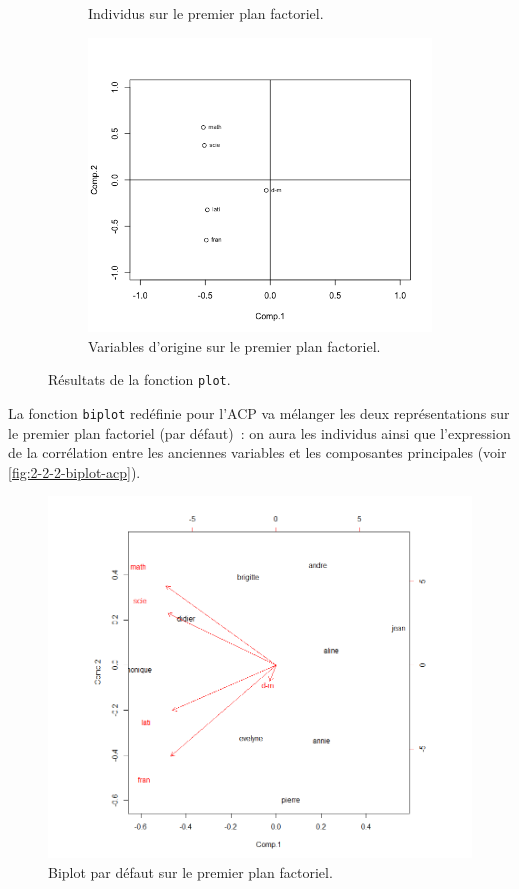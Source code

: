 \documentclass[a4paper,11pt]{report}
\begin{document}
\begin{figure}[H]
\begin{subfigure}[b]{0.28\linewidth}
		\caption{\scriptsize Individus sur le premier plan factoriel.}
		\label{fig:2-2-2-plot-acp-scores}
	\end{subfigure}%
	\begin{subfigure}[b]{0.28\linewidth}
		\centering
		\captionsetup{justification=centering}
		\includegraphics[width=1\linewidth]{img/2-2-2-plot-acp-loadings}
		\caption{\scriptsize Variables d'origine sur le premier plan factoriel.}
		\label{fig:2-2-2-plot-acp-loadings}
	\end{subfigure}%
	\caption{Résultats de la fonction \texttt{plot}.}
\end{figure}



La fonction \texttt{biplot} redéfinie pour l'ACP va mélanger les deux représentations sur le premier plan factoriel (par défaut)~: on aura les individus ainsi que l'expression de la corrélation entre les anciennes variables et les composantes principales (voir \autoref{fig:2-2-2-biplot-acp}).

\begin{figure}[H]
	\centering
	\captionsetup{justification=centering, margin=1cm}
	\includegraphics[width=.5\linewidth]{img/2-2-2-biplot-composante-1-2}
	\caption{\scriptsize Biplot par défaut sur le premier plan factoriel.}
	\label{fig:2-2-2-biplot-acp}
\end{figure}
\end{document}
